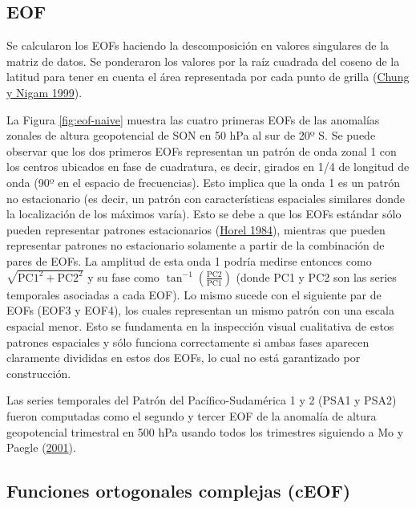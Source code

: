 \documentclass[12pt,oneside,a4paper]{reedthesis}
\begin{document}
\hypertarget{eof}{%
\subsection{EOF}\label{eof}}

Se calcularon los EOFs haciendo la descomposición en valores singulares de la matriz de datos.
Se ponderaron los valores por la raíz cuadrada del coseno de la latitud para tener en cuenta el área representada por cada punto de grilla (\protect\hyperlink{ref-chung1999}{Chung y Nigam 1999}).

La Figura \ref{fig:eof-naive} muestra las cuatro primeras EOFs de las anomalías zonales de altura geopotencial de SON en 50 hPa al sur de 20º S.
Se puede observar que los dos primeros EOFs representan un patrón de onda zonal 1 con los centros ubicados en fase de cuadratura, es decir, girados en 1/4 de longitud de onda (90º en el espacio de frecuencias).
Esto implica que la onda 1 es un patrón no estacionario (es decir, un patrón con características espaciales similares donde la localización de los máximos varía).
Esto se debe a que los EOFs estándar sólo pueden representar patrones estacionarios (\protect\hyperlink{ref-horel1984}{Horel 1984}), mientras que pueden representar patrones no estacionario solamente a partir de la combinación de pares de EOFs.
La amplitud de esta onda 1 podría medirse entonces como \(\sqrt{\mathrm{PC1}^2 + \mathrm{PC2}^2}\) y su fase como \(\tan^{-1} \left ( \frac{\mathrm{PC2}}{\mathrm{PC1}} \right )\) (donde PC1 y PC2 son las series temporales asociadas a cada EOF).
Lo mismo sucede con el siguiente par de EOFs (EOF3 y EOF4), los cuales representan un mismo patrón con una escala espacial menor.
Esto se fundamenta en la inspección visual cualitativa de estos patrones espaciales y sólo funciona correctamente si ambas fases aparecen claramente divididas en estos dos EOFs, lo cual no está garantizado por construcción.

Las series temporales del Patrón del Pacífico-Sudamérica 1 y 2 (PSA1 y PSA2) fueron computadas como el segundo y tercer EOF de la anomalía de altura geopotencial trimestral en 500 hPa usando todos los trimestres siguiendo a Mo y Paegle (\protect\hyperlink{ref-mo2001}{2001}).

\hypertarget{ceof-metodo}{%
\subsection{Funciones ortogonales complejas (cEOF)}\label{ceof-metodo}}
\end{document}
